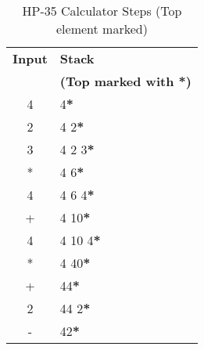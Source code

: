 \documentclass[a4paper,11pt]{article}
\begin{document}
\begin{table}[h!]
  \centering
  \begin{tabular}{|c|p{4cm}|}
  \hline
  \textbf{Input} & \textbf{Stack} \\ 
                 & \textbf{(Top marked with \textbf{*})} \\ \hline
  4      & 4\textbf{*} \\ \hline
  2      & 4 2\textbf{*} \\ \hline
  3      & 4 2 3\textbf{*} \\ \hline
  *      & 4 6\textbf{*} \\ \hline
  4      & 4 6 4\textbf{*} \\ \hline
  +      & 4 10\textbf{*} \\ \hline
  4      & 4 10 4\textbf{*} \\ \hline
  *      & 4 40\textbf{*} \\ \hline
  +      & 44\textbf{*} \\ \hline
  2      & 44 2\textbf{*} \\ \hline
  -      & 42\textbf{*} \\ \hline
  \end{tabular}
  \caption{HP-35 Calculator Steps (Top element marked)}
\end{table}
\end{document}
